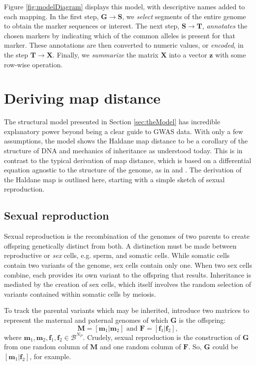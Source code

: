\documentclass[sts]{imsart}
\newcommand{\ve}[1]{\mathbf{#1}}           %
\newcommand{\m}[1]{\mathbf{#1}}               %
\begin{document}
Figure \ref{fig:modelDiagram} displays this model, with descriptive
names added to each mapping. In the first step, $\m{G} \rightarrow
\m{S}$, we \textit{select} segments of the entire genome to obtain the
marker sequences or interest. The next step, $\m{S} \rightarrow
\m{T}$, \textit{annotates} the chosen markers by indicating which of
the common alleles is present for that marker. These annotations are
then converted to numeric values, or \textit{encoded}, in the step
$\m{T} \rightarrow \m{X}$. Finally, we \textit{summarize} the matrix
$\m{X}$ into a vector $\ve{z}$ with some row-wise operation.


\section{Deriving map distance} \label{sec:derivingDists}

The structural model presented in Section \ref{sec:theModel} has incredible explanatory power beyond being a clear guide to GWAS data. With only a few assumptions, the model shows the Haldane map distance to be a corollary of the structure of DNA and mechanics of inheritance as understood today. This is in contrast to the typical derivation of map distance, which is based on a differential equation agnostic to the structure of the genome, as in \cite{kosambi1943estimation} and \cite{xu2013principles}. The derivation of the Haldane map is outlined here, starting with a simple sketch of sexual reproduction.

\subsection{Sexual reproduction} \label{subsec:crossingover}

Sexual reproduction is the recombination of the genomes of two parents to create offspring genetically distinct from both. A distinction must be made between reproductive or \emph{sex} cells, e.g. sperm, and somatic cells. While somatic cells contain two variants of the genome, sex cells contain only one. When two sex cells combine, each provides its own variant to the offspring that results. Inheritance is mediated by the creation of sex cells, which itself involves the random selection of variants contained within somatic cells by meiosis.

To track the parental variants which may be inherited, introduce two matrices to represent the maternal and paternal genomes of which $\m{G}$ is the offspring:
$$\m{M} = [\ve{m}_1| \ve{m}_2] \text{ and } \m{F} = [\ve{f}_1| \ve{f}_2],$$
where $\ve{m}_1, \ve{m}_2, \ve{f}_1, \ve{f}_2 \in \mathcal{B}^{N_P}$. Crudely, sexual reproduction is the construction of $\m{G}$ from one random column of $\m{M}$ and one random column of $\m{F}$. So, $\m{G}$ could be $[\ve{m}_1 | \ve{f}_2]$, for example.
\end{document}
